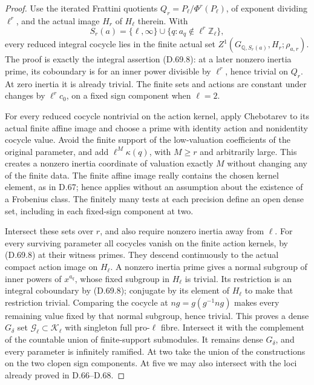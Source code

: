 \begin{proof}
Use the iterated Frattini quotients
\(Q_r=P_\ell/\Phi^r(P_\ell)\), of exponent
dividing \(\ell^r\), and the actual image
\(H_r\) of \(H_\ell\) therein. With
\[
 S_r(a)=\{\ell,\infty\}\cup
              \{q:a_q\notin\ell^r\mathbb Z_\ell\},
                                                        \tag{D.69.9}
\]
every reduced integral cocycle lies in the
finite actual set
\(Z^1(G_{\mathbb Q,S_r(a)},H_r;\rho_{a,r})\).
The proof is exactly the integral assertion
(D.69.8): at a later nonzero inertia prime,
its coboundary is for an inner power divisible
by \(\ell^r\), hence trivial on \(Q_r\).
At zero inertia it is already trivial.
The finite sets and actions are constant under
changes by \(\ell^r c_0\), on a fixed sign
component when \(\ell=2\).

For every reduced cocycle nontrivial on the
action kernel, apply Chebotarev to its actual
finite affine image and choose a prime with
identity action and nonidentity cocycle value.
Avoid the finite support of the low-valuation
coefficients of the original parameter, and
add \(\ell^M\kappa(q)\), with \(M\ge r\)
and arbitrarily large. This creates a nonzero
inertia coordinate of valuation exactly \(M\)
without changing any of the finite data.
The finite affine image really contains the
chosen kernel element, as in D.67; hence
\cite[Chapter V, Theorem 3.23]{PBC_MilneCFT}
applies without an assumption about the existence
of a Frobenius class. The finitely many tests
at each precision define an open dense set,
including in each fixed-sign component at two.

Intersect these sets over \(r\), and also
require nonzero inertia away from \(\ell\).
For every surviving parameter all cocycles
vanish on the finite action kernels, by
(D.69.8) at their witness primes. They descend
continuously to the actual compact action
image on \(H_\ell\). A nonzero inertia prime
gives a normal subgroup of inner powers of
\(x^{a_q}\), whose fixed subgroup in
\(H_\ell\) is trivial. Its restriction is
an integral coboundary by (D.69.8); conjugate
by its element of \(H_\ell\) to make that
restriction trivial. Comparing the cocycle at
\(ng=g(g^{-1}ng)\) makes every remaining
value fixed by that normal subgroup, hence
trivial. This proves a dense \(G_\delta\)
set \(\mathcal G_\ell\subset\mathcal K_\ell\)
with singleton full pro-\(\ell\) fibre.
Intersect it with the complement of the
countable union of finite-support submodules.
It remains dense \(G_\delta\), and every
parameter is infinitely ramified. At two
take the union of the constructions on the
two clopen sign components. At five we may
also intersect with the loci already proved
in D.66--D.68.


\end{proof}
